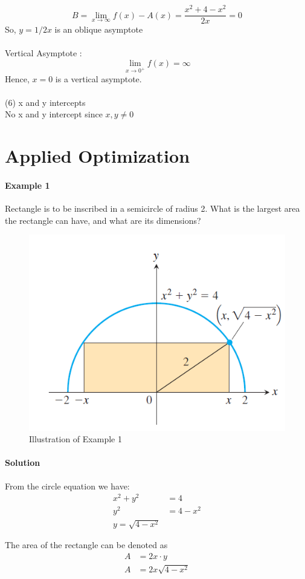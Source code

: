 \documentclass[12pt]{article}
\begin{document}
\[
    B = \lim_{x \to \infty} f(x) - A(x)  = \frac{x^2 + 4 - x^2}{2x} = 0 
\]
So, $y = 1/2x$ is an oblique asymptote\\ \\
Vertical Asymptote :
\[
    \lim_{x \to 0^{ +}} f(x) = \infty
\]
Hence, $x = 0$ is a vertical asymptote. \\ \\
(6) x and y intercepts \\
No x and y intercept since $x, y \neq 0$

\section{Applied Optimization}
\paragraph{Example 1}
Rectangle is to be inscribed in a semicircle of radius 2. What is the
largest area the rectangle can have, and what are its dimensions?
\begin{figure}[h!]
     \centering
     \includegraphics[width = 0.5\linewidth]{Images/applied example.png}
     \caption{Illustration of Example 1}
\end{figure}
\paragraph{Solution}
From the circle equation we have:
\begin{align*} 
    x^2 + y^2 &= 4 \\
    y^2 &= 4 - x^2 \\
    y = \sqrt{4 - x^2}
\end{align*}

The area of the rectangle can be denoted as
\begin{align*} 
     A &= 2x \cdot y \\
     A &= 2x \sqrt{4 - x^2}
\end{align*}
\end{document}
